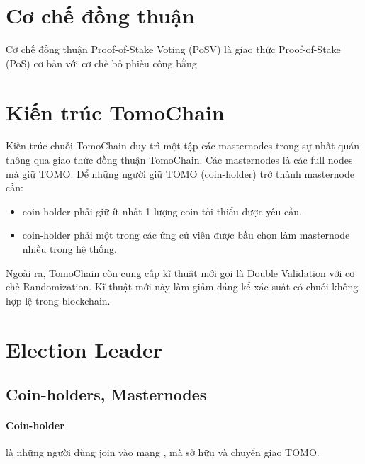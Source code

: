 \documentclass[12pt,a4paper]{article}
\begin{document}
	\section{Cơ chế đồng thuận}
	Cơ chế đồng thuận Proof-of-Stake Voting (PoSV) là giao thức Proof-of-Stake (PoS) cơ bản với cơ chế bỏ phiếu công bằng
	\section{Kiến trúc TomoChain}
	Kiến trúc chuỗi TomoChain duy trì một tập các masternodes trong sự nhất quán thông qua giao thức đồng thuận TomoChain. Các masternodes là các full nodes mà giữ TOMO. Để những người giữ TOMO (coin-holder) trở thành masternode cần:
	\begin{itemize}
		\item coin-holder phải giữ ít nhất 1 lượng coin tối thiểu được yêu cầu.
		\item coin-holder phải một trong các ứng cử viên được bầu chọn làm masternode nhiều trong hệ thống.
	\end{itemize} 
	Ngoài ra, TomoChain còn cung cấp kĩ thuật mới gọi là Double Validation với cơ chế Randomization.  Kĩ thuật mới này làm giảm đáng kể xác suất có chuỗi không hợp lệ trong blockchain.
	\section{Election Leader}
	\subsection{Coin-holders, Masternodes}
		\paragraph{Coin-holder}
		 là những người dùng join vào mạng , mà sở hữu và chuyển giao TOMO.
\end{document}
